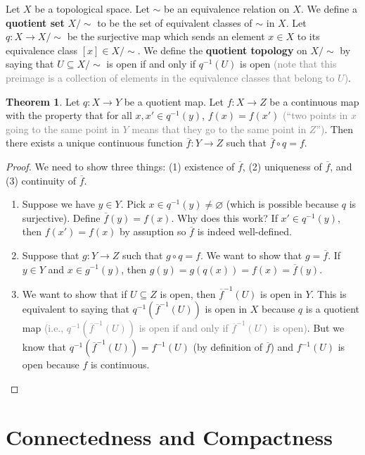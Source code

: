 \documentclass{article}
\newcommand{\com}[1]{\textcolor{grey}{#1}}
\theoremstyle{definition}
\newtheorem{theorem}{Theorem}[subsection]
\begin{document}
\begin{flushleft}
Let $X$ be a topological space. Let $\sim$ be an equivalence relation on $X$. We define a \textbf{quotient set} $X / \sim$ to be the set of equivalent classes of $\sim$ in $X$. Let $q : X \to X/\sim$ be the surjective map which sends an element $x \in X$ to its equivalence class $[x] \in X / \sim$. We define the \textbf{quotient topology} on $X / \sim$ by saying that $U \subseteq X / \sim$ is open if and only if $q^{-1}(U)$ is open \com{(note that this preimage is a collection of elements in the equivalence classes that belong to $U$)}.

\begin{theorem}
Let $q : X \to Y$ be a quotient map. Let $f : X \to Z$ be a continuous map with the property that for all $x, x' \in q^{-1}(y)$, $f(x) = f(x')$ \com{(``two points in $x$ going to the same point in $Y$ means that they go to the same point in $Z$'')}. Then there exists a unique continuous function $\overline{f} : Y \to Z$ such that $\overline{f} \circ q = f$.
\end{theorem}

\begin{proof}
We need to show three things: (1) existence of $\overline{f}$, (2) uniqueness of $\overline{f}$, and (3) continuity of $\overline{f}$.
\begin{enumerate}
    \item Suppose we have $y \in Y$. Pick $x \in q^{-1}(y) \neq \varnothing$ (which is possible because $q$ is surjective). Define $\overline{f}(y) = f(x)$. Why does this work? If $x' \in q^{-1}(y)$, then $f(x') = f(x)$ by assuption so $\overline{f}$ is indeed well-defined.
    \item Suppose that $g : Y \to Z$ such that $g \circ q = f$. We want to show that $g = \overline{f}$. If $y \in Y$ and $x \in g^{-1}(y)$, then $g(y) = g(q(x)) = f(x) = \overline{f}(y)$.
    \item We want to show that if $U \subseteq Z$ is open, then $\overline{f}^{-1}(U)$ is open in $Y$. This is equivalent to saying that $q^{-1}(\overline{f}^{-1}(U))$ is open in $X$ because $q$ is a quotient map \com{(i.e., $q^{-1}(\overline{f}^{-1}(U))$ is open if and only if $\overline{f}^{-1}(U)$ is open)}. But we know that $q^{-1}(\overline{f}^{-1}(U)) = f^{-1}(U)$ (by definition of $\overline{f}$) and $f^{-1}(U)$ is open because $f$ is continuous.
\end{enumerate}
\end{proof}

\section{Connectedness and Compactness}


\end{flushleft}
\end{document}
